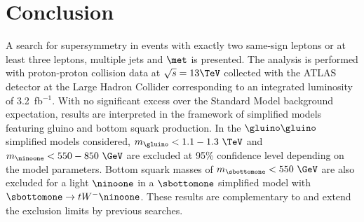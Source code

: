 \documentclass[UKenglish,texlive=2013]{\ATLASLATEXPATH atlasdoc}
\begin{document}


\FloatBarrier

\section{Conclusion}
\label{sec:conclusion}


A search for supersymmetry in events with exactly two same-sign leptons or at least three leptons, multiple jets and $\met$ is presented. 
The analysis is performed with proton-proton collision data at $\sqrt{s}=13\TeV$ collected with the ATLAS detector at the Large Hadron Collider corresponding to an integrated luminosity of 3.2~fb$^{-1}$. 
With no significant excess over the Standard Model background expectation,
results are interpreted in the framework of simplified models featuring gluino and bottom squark production.
In the $\gluino\gluino$ simplified models considered, $m_{\gluino}<1.1-1.3~\TeV$ and $m_{\ninoone}<550-850~\GeV$ 
are excluded at 95\% confidence level depending on the model parameters. Bottom squark masses of $m_{\sbottomone}<550~\GeV$ 
are also excluded for a light $\ninoone$ in a $\sbottomone$ simplified model with $\sbottomone\to tW^-\ninoone$.
These results are complementary to and extend the exclusion limits by previous searches.




\FloatBarrier
\clearpage

\printbibliography[title=References]
%
%
\end{document}
